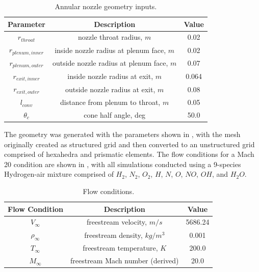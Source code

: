 \begin{table}[h]
  \centering
  \begin{tabular}{c|c|c}
    Parameter & Description & Value \\
    \hline
    $r_{throat}$       &   nozzle throat radius, $m$                 & 0.02 \\
    $r_{plenum,inner}$ &   inside nozzle radius at plenum face, $m$  & 0.02 \\
    $r_{plenum,outer}$ &   outside nozzle radius at plenum face, $m$ & 0.07 \\
    $r_{exit,inner}$   &   inside nozzle radius at exit, $m$         & 0.064 \\
    $r_{exit,outer}$   &   outside nozzle radius at exit, $m$        & 0.08 \\
    $l_{conv}$         &   distance from plenum to throat, $m$       & 0.05 \\
    $\theta_c$         &   cone half angle, deg                      & 50.0
  \end{tabular}
  \caption{Annular nozzle geometry inputs.}
  \label{tab:annular-geom}
\end{table}
The geometry was generated with the parameters shown in ,
with the mesh originally created as structured grid and then converted to an
unstructured grid comprised of hexahedra and prismatic elements.  The flow
conditions for a Mach 20 condition are shown in , with
all simulations conducted using a 9-species Hydrogen-air mixture comprised of
$H_2$, $N_2$, $O_2$, $H$, $N$, $O$, $NO$, $OH$, and $H_2 O$.
\begin{table}[!h]
  \centering
  \begin{tabular}{c|c|c}
    Flow Condition & Description & Value \\
    \hline
    $V_{\infty}$    & freestream velocity, $m/s$        & 5686.24 \\
    $\rho_{\infty}$ & freestream density, $kg/m^3$      & 0.001 \\
    $T_{\infty}$    & freestream temperature, $K$       & 200.0 \\
    $M_{\infty}$    & freestream Mach number (derived)  & 20.0
  \end{tabular}
  \caption{Flow conditions.}
  \label{tab:flow-conditions}
\end{table}

